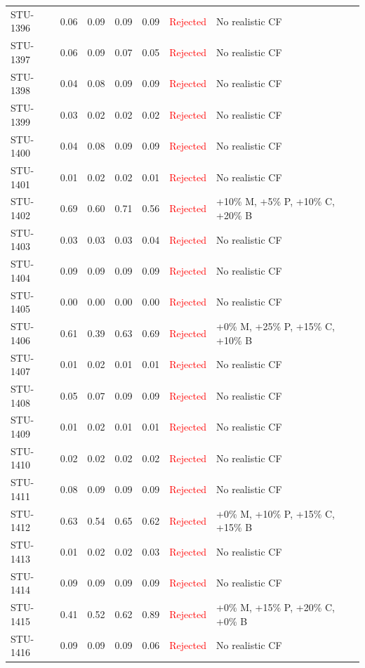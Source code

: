 \begin{longtable}{l c c c c | c | l}
STU-1396 & 0.06 & 0.09 & 0.09 & 0.09 & \textcolor{red}{Rejected} & No realistic CF \\
STU-1397 & 0.06 & 0.09 & 0.07 & 0.05 & \textcolor{red}{Rejected} & No realistic CF \\
STU-1398 & 0.04 & 0.08 & 0.09 & 0.09 & \textcolor{red}{Rejected} & No realistic CF \\
STU-1399 & 0.03 & 0.02 & 0.02 & 0.02 & \textcolor{red}{Rejected} & No realistic CF \\
STU-1400 & 0.04 & 0.08 & 0.09 & 0.09 & \textcolor{red}{Rejected} & No realistic CF \\
STU-1401 & 0.01 & 0.02 & 0.02 & 0.01 & \textcolor{red}{Rejected} & No realistic CF \\
STU-1402 & 0.69 & 0.60 & 0.71 & 0.56 & \textcolor{red}{Rejected} & +10\% M, +5\% P, +10\% C, +20\% B \\
STU-1403 & 0.03 & 0.03 & 0.03 & 0.04 & \textcolor{red}{Rejected} & No realistic CF \\
STU-1404 & 0.09 & 0.09 & 0.09 & 0.09 & \textcolor{red}{Rejected} & No realistic CF \\
STU-1405 & 0.00 & 0.00 & 0.00 & 0.00 & \textcolor{red}{Rejected} & No realistic CF \\
STU-1406 & 0.61 & 0.39 & 0.63 & 0.69 & \textcolor{red}{Rejected} & +0\% M, +25\% P, +15\% C, +10\% B \\
STU-1407 & 0.01 & 0.02 & 0.01 & 0.01 & \textcolor{red}{Rejected} & No realistic CF \\
STU-1408 & 0.05 & 0.07 & 0.09 & 0.09 & \textcolor{red}{Rejected} & No realistic CF \\
STU-1409 & 0.01 & 0.02 & 0.01 & 0.01 & \textcolor{red}{Rejected} & No realistic CF \\
STU-1410 & 0.02 & 0.02 & 0.02 & 0.02 & \textcolor{red}{Rejected} & No realistic CF \\
STU-1411 & 0.08 & 0.09 & 0.09 & 0.09 & \textcolor{red}{Rejected} & No realistic CF \\
STU-1412 & 0.63 & 0.54 & 0.65 & 0.62 & \textcolor{red}{Rejected} & +0\% M, +10\% P, +15\% C, +15\% B \\
STU-1413 & 0.01 & 0.02 & 0.02 & 0.03 & \textcolor{red}{Rejected} & No realistic CF \\
STU-1414 & 0.09 & 0.09 & 0.09 & 0.09 & \textcolor{red}{Rejected} & No realistic CF \\
STU-1415 & 0.41 & 0.52 & 0.62 & 0.89 & \textcolor{red}{Rejected} & +0\% M, +15\% P, +20\% C, +0\% B \\
STU-1416 & 0.09 & 0.09 & 0.09 & 0.06 & \textcolor{red}{Rejected} & No realistic CF \\

\end{longtable}
